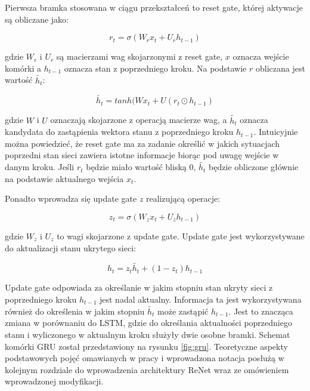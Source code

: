 \documentclass[oneside, mag]{mgr}
\begin{document}
Pierwsza bramka stosowana w ciągu przekształceń to reset gate, której aktywacje są obliczane jako:

\begin{equation}
	r_t = \sigma (W_r x_t + U_r h_{t-1})
\end{equation}

gdzie $W_r$ i $U_r$ są macierzami wag skojarzonymi z reset gate, $x$ oznacza wejście komórki a $h_{t-1}$ oznacza stan z poprzedniego kroku. Na podstawie $r$ obliczana jest wartość $\tilde{h_t}$:

\begin{equation}
	\tilde{h_t} = tanh(Wx_t + U(r_t \odot h_{t-1})
\end{equation}

gdzie $W$ i $U$ oznaczają skojarzone z operacją macierze wag, a $\tilde{h_t}$ oznacza kandydata do zastąpienia wektora stanu z poprzedniego kroku $h_{t-1}$. Intuicyjnie można powiedzieć, że reset gate ma za zadanie określić w jakich sytuacjach poprzedni stan sieci zawiera istotne informacje biorąc pod uwagę wejście w danym kroku. Jeśli $r_t$ będzie miało wartość bliską 0, $\tilde{h_t}$ będzie obliczone głównie na podstawie aktualnego wejścia $x_t$.

Ponadto wprowadza się update gate $z$ realizującą operacje:

\begin{equation}
	z_t = \sigma(W_z x_t + U_z h_{t-1})
\end{equation}

gdzie $W_z$ i $U_z$ to wagi skojarzone z update gate. Update gate jest wykorzystywane do aktualizacji stanu ukrytego sieci:

\begin{equation}
	h_t = z_t \tilde{h_t} + (1 - z_t) h_{t-1}
\end{equation}


Update gate odpowiada za określanie w jakim stopniu stan ukryty sieci z poprzedniego kroku $h_{t-1}$ jest nadal aktualny. Informacja ta jest wykorzystywana również do określenia w jakim stopniu $\tilde{h_t}$ może zastąpić $h_{t-1}$. Jest to znacząca zmiana w porównaniu do LSTM, gdzie do określania aktualności poprzedniego stanu i wyliczonego w aktualnym kroku służyły dwie osobne bramki. Schemat komórki GRU został przedstawiony na rysunku \ref{fig:gru}. Teoretyczne aspekty podstawowych pojęć omawianych w pracy i wprowadzona notacja posłużą w kolejnym rozdziale do wprowadzenia architektury ReNet wraz ze omówieniem wprowadzonej modyfikacji. 
\end{document}
